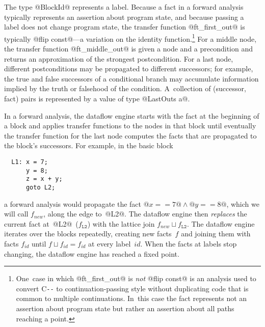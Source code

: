 \documentclass[blockstyle,preprint,nocopyrightspace]{sigplanconf}
\newcommand\join{\sqcup}
\newcommand\PAL{\mbox{C{\texttt{-{}-}}}}
\newcommand{\authornote}[1]{{\em #1}}
\def\authornote#1{\unskip\relax}
\newcommand{\norman}[1]{\authornote{NR: #1}}
\let\remark\norman
\begin{document}
The type @BlockId@ represents a label.
Because a fact in a forward analysis typically represents an assertion
about program state,
\remark{Somewhere we need an alert that a fact in a forward analysis
might also represent an assertion about all paths reaching a
 state---maybe a footnote here?}
 and because passing a label does not change
program state, the transfer function @ft_first_out@ is typically 
@flip const@---a variation on
the
identity function.\footnote
{One~case in which @ft\_first\_out@ is \emph{not} @flip const@ is an
 analysis used to convert {\PAL} to continuation-passing style without
 duplicating code that is common to multiple continuations.
In~this case the fact represents not an assertion about program state
 but rather an assertion about all paths reaching
 a point.}
\remark{Somewhere we should explain what a fact in a backward analysis
typically represents}
For a middle node, the transfer function @ft_middle_out@ is given a
node and a precondition and returns an approximation of the strongest
postcondition. 
For a last node, different postconditions may be propagated to
different successors; for example, the true and false successors of a
conditional branch may accumulate information implied by the truth or
falsehood of the condition.
A~collection of (successor, fact) pairs is represented by a value of
type @LastOuts a@.




In a forward analysis, the dataflow engine starts with the fact at the
beginning of a block and applies transfer functions to the nodes in
that block until eventually the transfer function for the last node
computes the facts that are propagated to the block's successors.
For example, in the basic block
\begin{verbatim}
  L1: x = 7;
      y = 8;
      z = x + y;
      goto L2;
\end{verbatim}
a forward analysis would propagate the fact 
$@x == 7@ \land @y == 8@$, which we will call $f_{\mathit{new}}$,
along the edge to~@L2@. 
\remark{We've elected not to get to the level of detail where
we show how propagating a fact~$f$ through \mbox{@x = 7;@} results in a new
fact either $(f \setminus @x@) \land @x == 7@$.}
The dataflow engine then \emph{replaces} the current fact
at~@L2@~($f_{\mathtt{L2}}$) with the lattice join $f_{\mathit{new}}
\join f_{\mathtt{L2}}$. 
The dataflow engine iterates over the blocks repeatedly, creating new
facts~$f$ and joining them with facts $f_{\mathit{id}}$ until
\mbox{$f \join f_{\mathit{id}} = f_{\mathit{id}}$} at every label~$\mathit{id}$.
When the facts at labels stop changing, the dataflow
engine has reached a fixed point.
\end{document}
